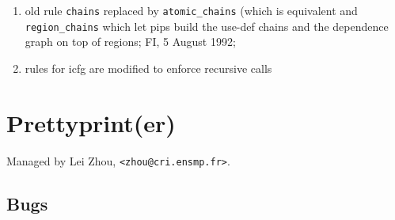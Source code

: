 \begin{enumerate}

  \item old rule \verb+chains+ replaced by \verb+atomic_chains+ (which
        is equivalent and \verb+region_chains+ which let pips build the
        use-def chains and the dependence graph on top of regions;
        FI, 5 August 1992;

  \item rules for icfg are modified to enforce recursive calls

\end{enumerate}

\section{Prettyprint(er)}

Managed by Lei Zhou, \verb+<zhou@cri.ensmp.fr>+.

\subsection{Bugs}

